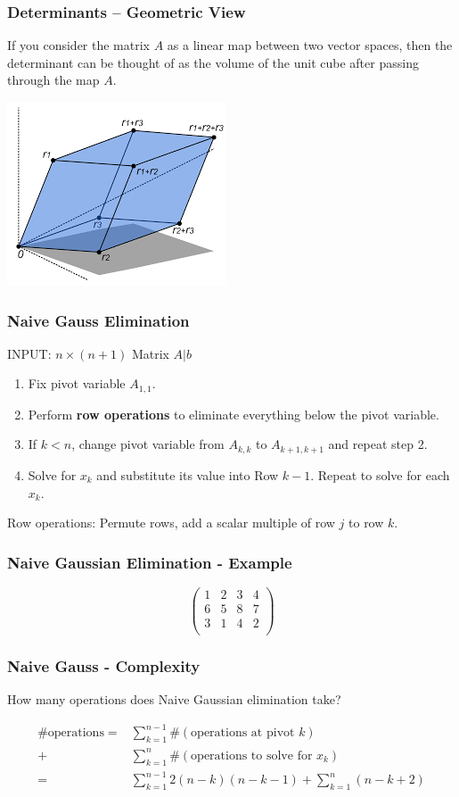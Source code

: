 \documentclass[12pt]{beamer}
\theoremstyle{definition}
\begin{document}
\begin{frame}
\frametitle{Determinants -- Geometric View}
If you consider the matrix $A$ as a linear map between
two vector spaces, then the determinant can be thought of
as the volume of the unit cube after passing through
the map $A$.

\centerline{\includegraphics[scale = .6]{gauss1.png}}


\end{frame}

\begin{frame}
\frametitle{Naive Gauss Elimination}
INPUT: $n \times (n+1)$ Matrix $A|b$
\begin{enumerate}
\item Fix pivot variable $A_{1,1}$.
\item Perform {\bf row operations} to eliminate everything 
below the pivot variable.
\item If $k < n$, change pivot variable from $A_{k,k}$ to $A_{k+1,k+1}$
and repeat step 2.
\item Solve for $x_k$ and substitute its value into Row $k-1$. Repeat to
solve for each $x_k$.
\end{enumerate}
Row operations: Permute rows, add a scalar multiple of row $j$
to row $k$.
\end{frame}

\begin{frame}
\frametitle{Naive Gaussian Elimination - Example}

\[
\left(\begin{array}{ccc|c}
1 & 2 & 3 & 4 \\
6 & 5 & 8 & 7 \\
3 & 1 & 4 & 2 \\
\end{array}\right)\]
\end{frame}

\begin{frame}
\frametitle{Naive Gauss - Complexity}
How many operations does Naive Gaussian elimination take?

\begin{align*}
\# \text{operations} =& \sum_{k = 1}^{n-1} \# (\text{operations at pivot  } k)\\
+& \sum_{k=1}^{n} \#(\text{operations to solve for  } x_k) \\
=& \sum_{k = 1}^{n-1} 2(n-k)(n-k-1) + \sum_{k = 1}^{n} (n-k + 2)
\end{align*}
\end{frame}
\end{document}
